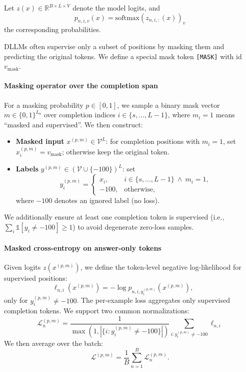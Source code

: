 Let $z(x) \in \mathbb{R}^{B \times L \times V}$ denote the model logits, and
\begin{equation}
p_{n,i,v}(x) = \mathrm{softmax}\!\left(z_{n,i,:}(x)\right)_v
\end{equation}
the corresponding probabilities.

DLLMs often supervise only a subset of positions by masking them and predicting the original tokens. We define a special mask token \texttt{[MASK]} with id $v_{\text{mask}}$.

\paragraph*{Masking operator over the completion span}
\label{sec:method:mask_operator}

For a masking probability $p \in [0,1]$, we sample a binary mask vector $m \in \{0,1\}^{L_a}$ over completion indices $i \in \{s,\dots,L-1\}$, where $m_i=1$ means ``masked and supervised''. We then construct:
\begin{itemize}
\item \textbf{Masked input} $x^{(p,m)} \in \mathcal{V}^{L}$: for completion positions with $m_i=1$, set $x^{(p,m)}_i = v_{\text{mask}}$; otherwise keep the original token.
\item \textbf{Labels} $y^{(p,m)} \in (\mathcal{V} \cup \{-100\})^{L}$: set
\begin{equation}
y^{(p,m)}_i =
\begin{cases}
x_i, & i \in \{s,\dots,L-1\} \ \wedge\ m_i=1,\\
-100, & \text{otherwise,}
\end{cases}
\end{equation}
where $-100$ denotes an ignored label (no loss).
\end{itemize}
We additionally ensure at least one completion token is supervised (i.e., $\sum_i \mathbb{1}[y_i \neq -100] \ge 1$) to avoid degenerate zero-loss samples.

\paragraph*{Masked cross-entropy on answer-only tokens}
\label{sec:method:loss}

Given logits $z(x^{(p,m)})$, we define the token-level negative log-likelihood for supervised positions:
\begin{equation}
\ell_{n,i}(x^{(p,m)}) = -\log p_{n,i, y^{(p,m)}_i}(x^{(p,m)}),
\qquad
\end{equation}
only for $y^{(p,m)}_i \neq -100$.
The per-example loss aggregates only supervised completion tokens. We support two common normalizations:
\begin{equation}
\mathcal{L}_n^{(p,m)} = \frac{1}{\max(1, |\{i: y^{(p,m)}_i \neq -100\}|)}\sum_{i: y^{(p,m)}_i \neq -100} \ell_{n,i}
\end{equation}
We then average over the batch:
\begin{equation}
\mathcal{L}^{(p,m)} = \frac{1}{B}\sum_{n=1}^{B} \mathcal{L}_n^{(p,m)}.
\end{equation}

